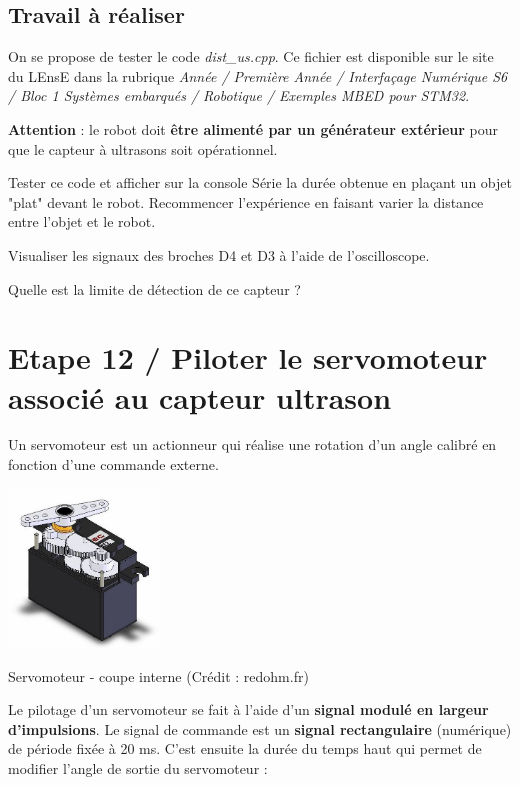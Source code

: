 \documentclass[a4paper,11pt,titlepage]{article} %
\begin{document}
\newpage
\subsection{Travail à réaliser}

On se propose de tester le code \textsl{dist\_us.cpp}. Ce fichier est disponible sur le site du LEnsE dans la rubrique \textit{Année / Première Année / Interfaçage Numérique S6 / Bloc 1 Systèmes embarqués / Robotique / Exemples MBED pour STM32}.

\textbf{Attention} : le robot doit \textbf{être alimenté par un générateur extérieur} pour que le capteur à ultrasons soit opérationnel.

\Manip Tester ce code et afficher sur la console Série la durée obtenue en  plaçant un objet "plat" devant le robot. Recommencer l'expérience en faisant varier la distance entre l'objet et le robot.

\Manip Visualiser les signaux des broches D4 et D3 à l'aide de l'oscilloscope.

\Quest Quelle est la limite de détection de ce capteur ?

\newpage
\section{Etape 12 / Piloter le servomoteur associé au capteur ultrason}

Un servomoteur est un actionneur qui réalise une rotation d'un angle calibré en fonction d'une commande externe.

\begin{center}
	\includegraphics[width=0.3\textwidth]{images/MINE_Nucleo_servomoteur-redohm.jpg}
	
	Servomoteur - coupe interne (Crédit : redohm.fr)
\end{center}

Le pilotage d'un servomoteur se fait à l'aide d'un \textbf{signal modulé en largeur d'impulsions}. Le signal de commande est un \textbf{signal rectangulaire} (numérique) de période fixée à 20 ms. C'est ensuite la durée du temps haut qui permet de modifier l'angle de sortie du servomoteur :
\end{document}
